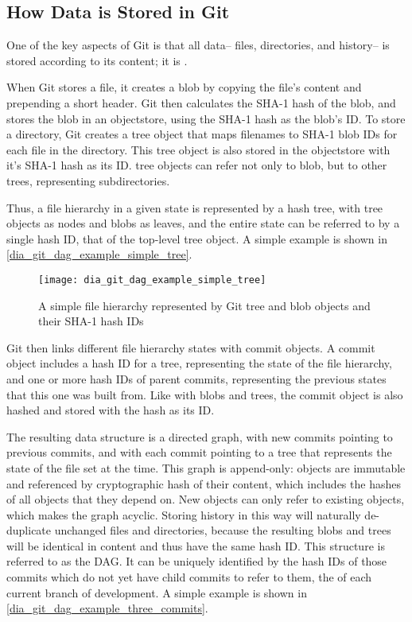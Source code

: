 %


\subsection{How Data is Stored in Git}

One of the key aspects of Git is that all data-- files, directories, and
history-- is stored according to its content; it is .

When Git stores a file, it creates a \gls{blob} by copying the file's content
and prepending a short header. Git then calculates the SHA-1 hash of the
\gls{blob}, and stores the \gls{blob} in an \gls{objectstore}, using the SHA-1
hash as the \gls{blob}'s ID. To store a directory, Git creates a \gls{tree}
object that maps filenames to SHA-1 \gls{blob} IDs for each file in the
directory. This \gls{tree} object is also stored in the \gls{objectstore} with
it's SHA-1 hash as its ID. \Gls{tree} objects can refer not only to \gls{blob},
but to other \glspl{tree}, representing subdirectories.

Thus, a file hierarchy in a given state is represented by a hash tree, with
\gls{tree} objects as nodes and \glspl{blob} as leaves, and the entire state can
be referred to by a single hash ID, that of the top-level \gls{tree} object. A
simple example is shown in \autoref{dia_git_dag_example_simple_tree}.

\begin{figure}[h]
    \centering
    \texttt{[image: dia\_git\_dag\_example\_simple\_tree]}
    \caption{A simple file hierarchy represented by Git tree and blob objects
    and their SHA-1 hash IDs}
    \label{dia_git_dag_example_simple_tree}
\end{figure}

Git then links different file hierarchy states with \gls{commit} objects. A
\gls{commit} object includes a hash ID for a \gls{tree}, representing the state
of the file hierarchy, and one or more hash IDs of parent \glspl{commit},
representing the previous states that this one was built from. Like with
\glspl{blob} and \glspl{tree}, the \gls{commit} object is also hashed and stored
with the hash as its ID.

The resulting data structure is a directed graph, with new \glspl{commit}
pointing to previous \glspl{commit}, and with each \gls{commit} pointing to a
\gls{tree} that represents the state of the file set at the time. This graph is
append-only: objects are immutable and referenced by cryptographic hash of their
content, which includes the hashes of all objects that they depend on. New
objects can only refer to existing objects, which makes the graph acyclic.
Storing history in this way will naturally de-duplicate unchanged files and
directories, because the resulting \glspl{blob} and \glspl{tree} will be
identical in content and thus have the same hash ID. This
 structure is referred to as the
\acrshort{DAG}. It can be uniquely identified by the hash IDs of
those \glspl{commit} which do not yet have child \glspl{commit} to refer to
them, the  of each current branch of development. A simple
example is shown in \autoref{dia_git_dag_example_three_commits}.

